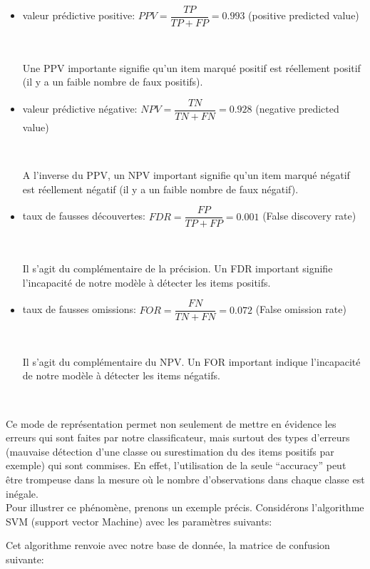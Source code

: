 \documentclass[a4paper]{report}
\begin{document}
\begin{itemize}
\item valeur prédictive positive: $PPV=\dfrac{TP}{TP+FP}=0.993$  (positive predicted value)

~\par

Une PPV importante signifie qu'un item marqué positif est réellement positif (il y a un faible nombre de faux positifs). 

\item valeur prédictive négative: $NPV=\dfrac{TN}{TN+FN}=0.928$ (negative predicted value)

~\par

A l'inverse du PPV, un NPV important signifie qu'un item marqué négatif est réellement négatif (il y a un faible nombre de faux négatif).


\item taux de fausses découvertes: $FDR=\dfrac{FP}{TP+FP}=0.001$   (False discovery rate)

~\par

Il s'agit du complémentaire de la précision. Un FDR important signifie l'incapacité de notre modèle à détecter les items positifs. 

\item taux de fausses omissions: $FOR=\dfrac{FN}{TN+FN}=0.072$ (False omission rate)

~\par

Il s'agit du complémentaire du NPV. Un FOR important indique l'incapacité de notre modèle à détecter les items négatifs. 

\end{itemize}

~\par

Ce mode de représentation permet non seulement de mettre en évidence les erreurs qui sont faites par notre classificateur, mais surtout des types d'erreurs (mauvaise détection d'une classe ou surestimation du des items positifs par exemple) qui sont commises. En effet, l'utilisation de la seule “accuracy” peut être trompeuse dans la mesure où le nombre d'observations dans chaque classe est inégale. \\
\medskip
Pour illustrer ce phénomène, prenons un exemple précis. Considérons l'algorithme SVM (support vector Machine) avec les paramètres suivants:
\medbreak

\begin{center}
\noindent
{}
\end{center}
\medbreak
Cet algorithme renvoie avec notre base de donnée, la matrice de confusion suivante: 
\end{document}
